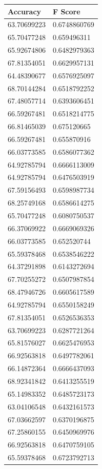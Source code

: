 \begin{longtable}{@{}ll@{}}
	\toprule
Accuracy    & F Score      \\ \midrule
63.70699223 & 0.6748860769 \\
65.70477248 & 0.659496311  \\
65.92674806 & 0.6482979363 \\
67.81354051 & 0.6629957131 \\
64.48390677 & 0.6576925097 \\
68.70144284 & 0.6518792252 \\
67.48057714 & 0.6393606451 \\
66.59267481 & 0.6518214775 \\
66.81465039 & 0.675120665  \\
66.59267481 & 0.655870916  \\
66.03773585 & 0.6586077362 \\
64.92785794 & 0.6666113009 \\
64.92785794 & 0.6476503919 \\
67.59156493 & 0.6598987734 \\
68.25749168 & 0.6586614275 \\
65.70477248 & 0.6080750537 \\
66.37069922 & 0.6669069326 \\
66.03773585 & 0.652520744  \\
65.59378468 & 0.6538546222 \\
64.37291898 & 0.6143272694 \\
67.70255272 & 0.6507987854 \\
68.47946726 & 0.6605617589 \\
64.92785794 & 0.6550158249 \\
67.81354051 & 0.6526536353 \\
63.70699223 & 0.6287721264 \\
65.81576027 & 0.6625476953 \\
66.92563818 & 0.6497782061 \\
66.14872364 & 0.6666437093 \\
68.92341842 & 0.6413255519 \\
65.14983352 & 0.6485723173 \\
63.04106548 & 0.6432161573 \\
67.03662597 & 0.6370196875 \\
67.25860155 & 0.6450969976 \\
66.92563818 & 0.6470759105 \\
65.59378468 & 0.6723792713 \\

\end{longtable}
